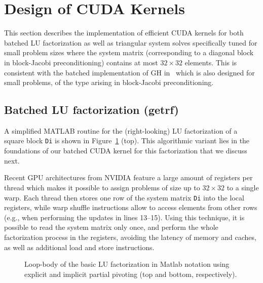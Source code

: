  \section{Design of CUDA Kernels}
 \label{2017-lu-block-jacobi:sec:kernel}

This section describes the implementation
of efficient CUDA kernels for both batched LU factorization
as well as triangular system solves
specifically tuned for small problem sizes
where the system matrix (corresponding to a diagonal block in block-Jacobi preconditioning) 
contains at most $32 \times 32$ elements.
This is consistent with the batched implementation of GH in~\cite{gh}
which is also designed for small problems, of the type arising in block-Jacobi preconditioning.

\subsection{Batched LU factorization ({\sc getrf})}

A simplified MATLAB routine for the
(right-looking) LU factorization of a square block \texttt{Di} is shown in Figure~\ref{2017-lu-block-jacobi:fig:lu} (top).
This algorithmic variant lies in the foundations of our batched CUDA kernel for this factorization that
we discuss next.

Recent GPU architectures from NVIDIA 
feature a large amount of registers per thread
which makes it possible to assign problems of size up to $32 \times 32$
to a single warp.
Each thread then stores one row of the system matrix \texttt{Di}
into the local registers,
while warp shuffle instructions
allow to access elements from other rows
(e.g., when performing the updates in lines 13--15).
Using this technique, it is possible to read the system matrix only once,
and perform the whole factorization process in the registers,
avoiding the latency of memory and caches,
as well as additional load and store instructions.

\begin{figure}
\begin{center}
\begin{minipage}{0.9\columnwidth}
{\small

}
\end{minipage}
\begin{minipage}{0.9\columnwidth}
{\small

}
\end{minipage}
\caption{Loop-body of the basic LU factorization in Matlab notation
    using explicit and implicit partial pivoting (top and bottom, respectively).}
\label{2017-lu-block-jacobi:fig:lu}
\end{center}
\end{figure}

